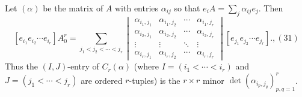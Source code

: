 Let $(\alpha)$ be the matrix of $A$ with entries $\alpha_{ij}$ so that $e_i A = \sum_j \alpha_{ij} e_j$. Then
$$[e_{i_1} e_{i_2} \cdots e_{i_r}] A_0^r = \sum_{j_1 < j_2 < \cdots < j_r} \begin{vmatrix}
\alpha_{i_1, j_1} & \alpha_{i_1, j_2} & \cdots & \alpha_{i_1, j_r} \\
\alpha_{i_2, j_1} & \alpha_{i_2, j_2} & \cdots & \alpha_{i_2, j_r} \\
\vdots & \vdots & \ddots & \vdots \\
\alpha_{i_r, j_1} & \alpha_{i_r, j_2} & \cdots & \alpha_{i_r, j_r}
\end{vmatrix} [e_{j_1} e_{j_2} \cdots e_{j_r}]. \tag{30},(31)$$
Thus the $(I, J)$-entry of $C_r(\alpha)$ (where $I = (i_1 < \cdots < i_r)$ and $J = (j_1 < \cdots < j_r)$ are ordered $r$-tuples) is the $r \times r$ minor $\det(\alpha_{i_p, j_q})_{p,q=1}^r$.
